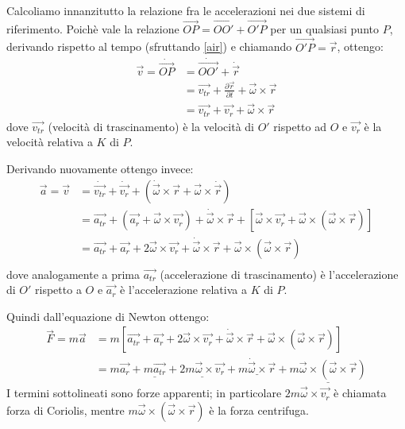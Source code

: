 \documentclass[../main.tex]{subfiles}
\begin{document}
Calcoliamo innanzitutto la relazione fra le accelerazioni nei due sistemi di riferimento. Poichè vale la
relazione $\overrightarrow{OP}=\overrightarrow{OO'}+\overrightarrow{O'P}$ per un qualsiasi punto $P$, derivando 
rispetto al tempo (sfruttando \cref{air}) e chiamando $\overrightarrow{O'P}=\vec{r}$, ottengo:
\begin{equation}\label{VelNonInerziale}
\begin{split}
	\vec{v}=\dot{\overrightarrow{OP}}	& =\dot{\overrightarrow{OO'}}+\dot{\vec{r}}\\
													& =\overrightarrow{v_{tr}}+\frac{\partial \vec r}{\partial t}+\vec{\omega}\times\vec{r}\\
													& =\overrightarrow{v_{tr}}+\vec{v_r}+\vec{\omega}\times\vec{r}
\end{split}
\end{equation}
dove $\overrightarrow{v_{tr}}$ (velocità di trascinamento) è la velocità di $O'$ rispetto ad $O$ e $\overrightarrow{v_r}$ è la velocità relativa
a $K$ di $P$.

Derivando nuovamente ottengo invece:
\begin{equation}\label{AccNonInerziale}
\begin{split}
	\vec{a}=\vec{v}	& =\dot{\overrightarrow{v_{tr}}}+\dot{\vec{v_r}}+\left(\dot{\vec{\omega}}\times\vec{r}+\vec{\omega}\times\dot{\vec{r}}\right)\\
											& =\overrightarrow{a_{tr}}+\left(\vec{a_r}+\vec{\omega}\times\vec{v_r}\right)+\dot{\vec{\omega}}\times\vec{r}+\left[\vec{\omega}\times\vec{v_r}+\vec{\omega}\times(\vec{\omega}\times\vec{r})\right]\\
											& =\overrightarrow{a_{tr}}+\vec{a_r}+2\vec{\omega}\times\vec{v_r}+\dot{\vec{\omega}}\times\vec{r}+\vec{\omega}\times(\vec{\omega}\times\vec{r})\\
\end{split}
\end{equation}
dove analogamente a prima $\overrightarrow{a_{tr}}$ (accelerazione di trascinamento) è l'accelerazione di $O'$ rispetto a $O$ e $\overrightarrow{a_r}$ è l'accelerazione relativa a $K$ di $P$.

Quindi dall'equazione di Newton ottengo:
\begin{equation*}
\begin{split}
	\vec{F}=m\vec{a}	& =m\left[\overrightarrow{a_{tr}}+\vec{a_r}+2\vec{\omega}\times\vec{v_r}+\dot{\vec{\omega}}\times\vec{r}+\vec{\omega}\times(\vec{\omega}\times\vec{r})\right]\\
											& =m\vec{a_r}+\underline{m\overrightarrow{a_{tr}}}+\underline{2m\vec{\omega}\times\vec{v_r}}+\underline{m\dot{\vec{\omega}}\times\vec{r}}+\underline{m\vec{\omega}\times(\vec{\omega}\times\vec{r})}
\end{split}
\end{equation*}
I termini sottolineati sono forze apparenti; in particolare $2m\vec{\omega}\times\vec{v_r}$
è chiamata forza di Coriolis, mentre $m\vec{\omega}\times(\vec{\omega}\times\vec{r})$
è la forza centrifuga.
\end{document}
